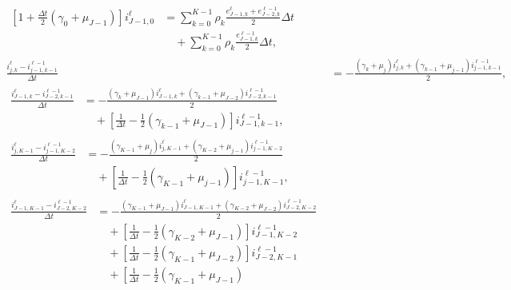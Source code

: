 \documentclass{jpmarticle}
\let\subequationsorig\subequations%
\let\endsubequationsorig\endsubequations%
\renewenvironment{subequations}{
  \subequationsorig
  \renewcommand{\theequation}{\theparentequation.\arabic{equation}}
}{
  \endsubequationsorig
}
\begin{document}
\begin{subequations}
\begin{align}
\begin{split}
      \left[1 + \frac{\Delta t}{2} (\gamma_0 + \mu_{J - 1})\right]
      i_{J - 1, 0}^{\ell}
      &= \sum_{k = 0}^{K - 1} \rho_k
      \frac{e_{J - 1, k}^{\ell} + e_{J - 2, k}^{\ell - 1}} {2}
      \Delta t
      \\ & \quad {}
      + \sum_{k = 0}^{K - 1} \rho_k
      \frac{e_{J - 1, k}^{\ell - 1}} {2}
      \Delta t,
    \end{split}
    \\
    \frac{i_{j, k}^{\ell} - i_{j - 1, k - 1}^{\ell - 1}}{\Delta t}
    &= - \frac{(\gamma_k + \mu_j) i_{j, k}^{\ell}
      + (\gamma_{k - 1} + \mu_{j - 1}) i_{j - 1, k - 1}^{\ell - 1}}
    {2},
    \\
    \begin{split}
      \frac{i_{J - 1, k}^{\ell} - i_{J - 2, k - 1}^{\ell - 1}}{\Delta t}
      &= - \frac{(\gamma_k + \mu_{J - 1}) i_{J - 1, k}^{\ell}
        + (\gamma_{k - 1} + \mu_{J - 2}) i_{J - 2, k - 1}^{\ell - 1}}
      {2}
      \\ & \quad {}
      + \left[
        \frac{1}{\Delta t} - \frac{1}{2} (\gamma_{k - 1} + \mu_{J - 1})
      \right] i_{J - 1, k - 1}^{\ell - 1},
    \end{split}
    \\
    \begin{split}
      \frac{i_{j, K - 1}^{\ell} - i_{j - 1, K - 2}^{\ell - 1}}{\Delta t}
      &= - \frac{(\gamma_{K - 1} + \mu_j) i_{j, K - 1}^{\ell}
        + (\gamma_{K - 2} + \mu_{j - 1}) i_{j - 1, K - 2}^{\ell - 1}}
      {2}
      \\ & \quad {}
      + \left[
        \frac{1}{\Delta t} - \frac{1}{2} (\gamma_{K - 1} + \mu_{j - 1})
      \right] i_{j - 1, K - 1}^{\ell - 1},
    \end{split}
    \\
    \begin{split}
      \frac{i_{J - 1, K - 1}^{\ell} - i_{J - 2, K - 2}^{\ell - 1}}{\Delta t}
      &= - \frac{(\gamma_{K - 1} + \mu_{J - 1}) i_{J - 1, K - 1}^{\ell}
        + (\gamma_{K - 2} + \mu_{J - 2}) i_{J - 2, K - 2}^{\ell - 1}}
      {2}
      \\ & \quad {}
      + \left[
        \frac{1}{\Delta t} - \frac{1}{2} (\gamma_{K - 2} + \mu_{J - 1})
      \right] i_{J - 1, K - 2}^{\ell - 1}
      \\ & \quad {}
      + \left[
        \frac{1}{\Delta t} - \frac{1}{2} (\gamma_{K - 1} + \mu_{J - 2})
      \right] i_{J - 2, K - 1}^{\ell - 1}
      \\ & \quad {}
      + \left[
        \frac{1}{\Delta t} - \frac{1}{2} (\gamma_{K - 1} + \mu_{J - 1})

\end{split}
\end{align}
\end{subequations}
\end{document}
